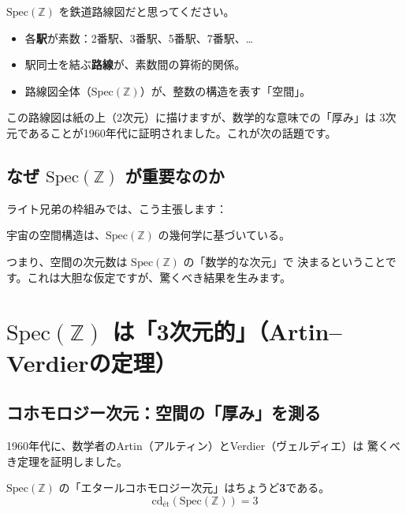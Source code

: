 \documentclass[12pt,a4paper]{article}
\begin{document}
\begin{analogy}[鉄道路線図のアナロジー]
$\mathrm{Spec}(\mathbb{Z})$ を鉄道路線図だと思ってください。
\begin{itemize}
  \item 各\textbf{駅}が素数：2番駅、3番駅、5番駅、7番駅、\ldots
  \item 駅同士を結ぶ\textbf{路線}が、素数間の算術的関係。
  \item 路線図全体（$\mathrm{Spec}(\mathbb{Z})$）が、整数の構造を表す「空間」。
\end{itemize}
この路線図は紙の上（2次元）に描けますが、数学的な意味での「厚み」は
3次元であることが1960年代に証明されました。これが次の話題です。
\end{analogy}

\subsection{なぜ $\mathrm{Spec}(\mathbb{Z})$ が重要なのか}

ライト兄弟の枠組みでは、こう主張します：

\begin{keypoint}[基本仮定]
宇宙の空間構造は、$\mathrm{Spec}(\mathbb{Z})$ の幾何学に基づいている。
\end{keypoint}

つまり、空間の次元数は $\mathrm{Spec}(\mathbb{Z})$ の「数学的な次元」で
決まるということです。これは大胆な仮定ですが、驚くべき結果を生みます。

\section{$\mathrm{Spec}(\mathbb{Z})$ は「3次元的」（Artin--Verdierの定理）}

\subsection{コホモロジー次元：空間の「厚み」を測る}

1960年代に、数学者のArtin（アルティン）とVerdier（ヴェルディエ）は
驚くべき定理を証明しました。

\begin{keypoint}
$\mathrm{Spec}(\mathbb{Z})$ の「エタールコホモロジー次元」はちょうど\textbf{3}である。
\[
  \mathrm{cd}_{\text{\'et}}(\mathrm{Spec}(\mathbb{Z})) = 3
\]
\end{keypoint}
\end{document}
